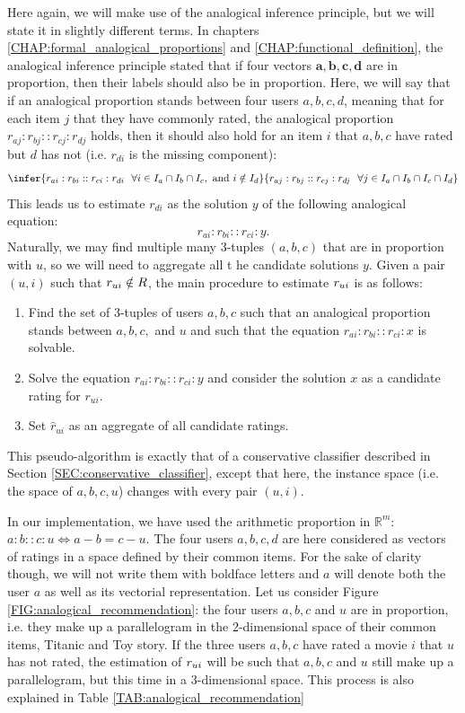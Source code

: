 Here again, we will make use of the analogical inference principle, but we will
state it in slightly different terms. In chapters
\ref{CHAP:formal_analogical_proportions} and \ref{CHAP:functional_definition},
the analogical inference principle stated that if four vectors $\mathbf{a},
\mathbf{b}, \mathbf{c}, \mathbf{d}$ are in proportion, then their labels should
also be in proportion.  Here, we will say that if an analogical proportion
stands between four users $a, b, c, d$, meaning that for each item $j$ that
they have commonly rated, the analogical proportion $r_{aj} : r_{bj} :: r_{cj}
: r_{dj}$ holds, then it should also hold for an item $i$ that $a, b, c$ have
rated but $d$ has not (i.e. $r_{di}$ is the missing component):
$$
\infer{
r_{ai} : r_{bi} :: r_{ci} : r_{di} ~~ \forall i \in I_a \cap I_b \cap I_c,
\text{ and } i\notin I_d }{r_{aj} : r_{bj} :: r_{cj} : r_{dj} ~~ \forall j \in
I_a \cap I_b \cap I_c \cap  I_d}
$$
This leads us to estimate $r_{di}$ as the solution $y$ of the following
analogical equation:
$$r_{ai} : r_{bi} :: r_{ci} : y.$$
Naturally, we may find multiple many $3$-tuples $(a, b, c)$ that are in proportion with
$u$, so we will need  to aggregate all t he candidate solutions $y$.  Given a
pair $(u,i)$ such that $r_{ui} \notin R$, the main procedure to estimate $r_{ui}$
is as follows:
\begin{enumerate}
\item Find the set of 3-tuples of users $a, b, c$ such that an analogical
  proportion stands between $a, b, c,$ and $u$ and such that the equation
    $r_{ai} : r_{bi} :: r_{ci} : x$ is solvable.
\item Solve the equation $r_{ai} : r_{bi} :: r_{ci} : y$ and consider the
  solution $x$ as a candidate rating for $r_{ui}$.
\item Set $\hat{r}_{ui}$ as an aggregate of all candidate ratings.
\end{enumerate}

This pseudo-algorithm is exactly that of a conservative classifier described in
Section \ref{SEC:conservative_classifier}, except that here, the instance space
(i.e. the space of $a, b, c, u$) changes with every pair $(u, i)$.

In our implementation, we have used the arithmetic proportion in
$\mathbb{R}^m$: $a:b::c:u \iff a - b = c - u$.  The four users $a, b, c, d$ are
here considered as vectors of ratings in a space defined by their common items.
For the sake of clarity though, we will not write them with boldface letters
and $a$ will denote both the user $a$ as well as its vectorial representation.
Let us consider Figure \ref{FIG:analogical_recommendation}: the four users $a,
b, c$ and $u$ are in proportion, i.e. they make up a parallelogram in the
2-dimensional space of their common items, Titanic and Toy story. If the
three users $a, b, c$ have rated a movie $i$ that $u$ has not rated, the
estimation of $r_{ui}$ will be such that $a, b, c$ and $u$ still make up a
parallelogram, but this time in a 3-dimensional space. This process is also
explained in Table \ref{TAB:analogical_recommendation}

